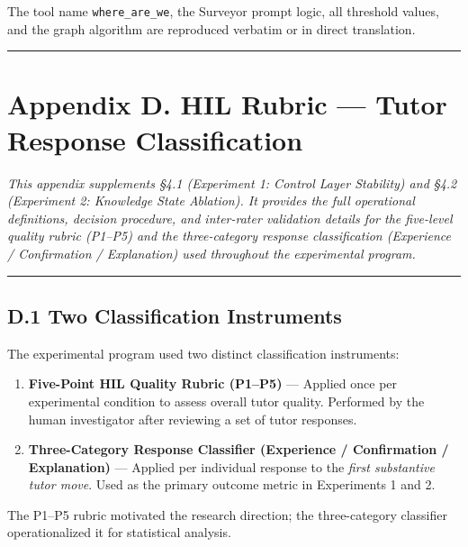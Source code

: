 \documentclass[
]{article}
\providecommand{\tightlist}{%
  \setlength{\itemsep}{0pt}\setlength{\parskip}{0pt}}
\begin{document}
The tool name \texttt{where\_are\_we}, the Surveyor prompt logic, all threshold values, and the graph algorithm are reproduced verbatim or in direct translation.

\begin{center}\rule{0.5\linewidth}{0.5pt}\end{center}

\section{Appendix D. HIL Rubric --- Tutor Response Classification}\label{appendix-d-hil-rubric--tutor-response-classification}

\emph{This appendix supplements §4.1 (Experiment 1: Control Layer Stability) and §4.2 (Experiment 2: Knowledge State Ablation). It provides the full operational definitions, decision procedure, and inter-rater validation details for the five-level quality rubric (P1--P5) and the three-category response classification (Experience / Confirmation / Explanation) used throughout the experimental program.}

\begin{center}\rule{0.5\linewidth}{0.5pt}\end{center}

\subsection{D.1 Two Classification Instruments}\label{d1-two-classification-instruments}

The experimental program used two distinct classification instruments:

\begin{enumerate}
\def\labelenumi{\arabic{enumi}.}
\tightlist
\item
  \textbf{Five-Point HIL Quality Rubric (P1--P5)} --- Applied once per experimental condition to assess overall tutor quality. Performed by the human investigator after reviewing a set of tutor responses.
\item
  \textbf{Three-Category Response Classifier (Experience / Confirmation / Explanation)} --- Applied per individual response to the \emph{first substantive tutor move}. Used as the primary outcome metric in Experiments 1 and 2.
\end{enumerate}

The P1--P5 rubric motivated the research direction; the three-category classifier operationalized it for statistical analysis.
\end{document}
